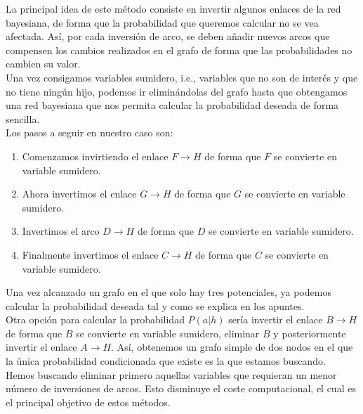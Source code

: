 \documentclass[12pt,a4paper]{article}
\begin{document}
\begin{description}
    La principal idea de este método consiste en invertir algunos enlaces de la red bayesiana, de forma que la probabilidad que queremos calcular no se vea afectada. Así, por cada inversión de arco, se deben añadir nuevos arcos que compensen los cambios realizados en el grafo de forma que las probabilidades no cambien su valor.\\
    Una vez consigamos variables sumidero, i.e., variables que no son de interés y que no tiene ningún hijo, podemos ir eliminándolas del grafo hasta que obtengamos una red bayesiana que nos permita calcular la probabilidad deseada de forma sencilla.\\
    Los pasos a seguir en nuestro caso son:
    \begin{enumerate}
        \item Comenzamos invirtiendo el enlace $F \to H$ de forma que $F$ se convierte en variable sumidero. 
        \item Ahora invertimos el enlace $G \to H$ de forma que $G$ se convierte en variable sumidero.
        \item Invertimos el arco $D \to H$ de forma que $D$ se convierte en variable sumidero.
        \item Finalmente invertimos el enlace $C \to H$ de forma que $C$ se convierte en variable sumidero.
    \end{enumerate} 

    Una vez alcanzado un grafo en el que solo hay tres potenciales, ya podemos calcular la probabilidad deseada tal y como se explica en los apuntes.\\

    Otra opción para calcular la probabilidad $P(a | h)$ sería invertir el enlace $B \to H$ de forma que $B$ se convierte en variable sumidero, eliminar $B$ y posteriormente invertir el enlace $A \to H$. Así, obtenemos un grafo simple de dos nodos en el que la única probabilidad condicionada que existe es la que estamos buscando.\\

    Hemos buscando eliminar primero aquellas variables que requieran un menor número de inversiones de arcos. Esto disminuye el coste computacional, el cual es el principal objetivo de estos métodos.

    \newpage
    \begin{figure}
        \centering
        \begin{subfigure}{0.4\textwidth}
\end{subfigure}
\end{figure}
\end{description}
\end{document}

